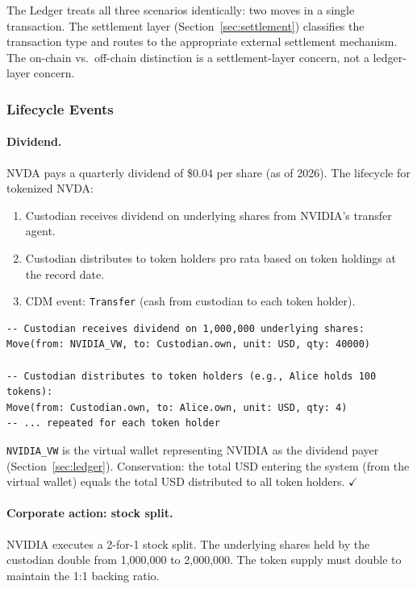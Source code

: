 \documentclass[11pt,a4paper]{article}
\begin{document}
\noindent The Ledger treats all three scenarios identically: two moves in a single transaction. The settlement layer (Section~\ref{sec:settlement}) classifies the transaction type and routes to the appropriate external settlement mechanism. The on-chain vs.\ off-chain distinction is a settlement-layer concern, not a ledger-layer concern.

\subsubsection{Lifecycle Events}
\label{sec:cdm-tokenized-lifecycle}

\paragraph{Dividend.} NVDA pays a quarterly dividend of \$0.04 per share (as of 2026). The lifecycle for tokenized NVDA:

\begin{enumerate}[nosep]
\item Custodian receives dividend on underlying shares from NVIDIA's transfer agent.
\item Custodian distributes to token holders pro rata based on token holdings at the record date.
\item CDM event: \texttt{Transfer} (cash from custodian to each token holder).
\end{enumerate}

\begin{lstlisting}
-- Custodian receives dividend on 1,000,000 underlying shares:
Move(from: NVIDIA_VW, to: Custodian.own, unit: USD, qty: 40000)

-- Custodian distributes to token holders (e.g., Alice holds 100 tokens):
Move(from: Custodian.own, to: Alice.own, unit: USD, qty: 4)
-- ... repeated for each token holder
\end{lstlisting}

\noindent \texttt{NVIDIA\_VW} is the virtual wallet representing NVIDIA as the dividend payer (Section~\ref{sec:ledger}). Conservation: the total USD entering the system (from the virtual wallet) equals the total USD distributed to all token holders. $\checkmark$

\paragraph{Corporate action: stock split.} NVIDIA executes a 2-for-1 stock split. The underlying shares held by the custodian double from 1,000,000 to 2,000,000. The token supply must double to maintain the 1:1 backing ratio.
\end{document}
